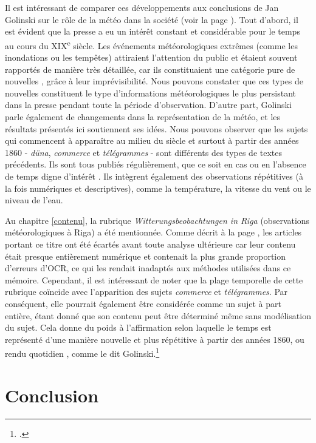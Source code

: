 \documentclass[a4paper,twoside,12pt]{article}
\begin{document}
Il est intéressant de comparer ces développements aux conclusions de Jan Golinski sur le rôle de la météo dans la société (voir la page \pageref{golinski}). Tout d'abord, il est évident que la presse a eu un intérêt constant et considérable pour le temps au cours du XIX\textsuperscript{e} siècle. Les événements météorologiques extrêmes (comme les inondations ou les tempêtes) attiraient l'attention du public et étaient souvent rapportés de manière très détaillée, car ils constituaient une catégorie pure de \og nouvelles \fg{}, grâce à leur imprévisibilité. Nous pouvons constater que ces types de nouvelles constituent le type d'informations météorologiques le plus persistant dans la presse pendant toute la période d'observation. D'autre part, Golinski parle également de changements dans la représentation de la météo, et les résultats présentés ici soutiennent ses idées. Nous pouvons observer que les sujets qui commencent à apparaître au milieu du siècle et surtout à partir des années 1860 - \textit{düna}, \textit{commerce} et \textit{télégrammes} - sont différents des types de textes précédents. Ils sont tous publiés régulièrement, que ce soit en cas ou en l'absence de temps \og digne d'intérêt \fg{}. Ils intègrent également des observations répétitives (à la fois numériques et descriptives), comme la température, la vitesse du vent ou le niveau de l'eau. 

Au chapitre \ref{contenu}, la rubrique \textit{Witterungsbeobachtungen in Riga} (observations météorologiques à Riga) a été mentionnée. Comme décrit à la page \pageref{beobachtungen_riga}, les articles portant ce titre ont été écartés avant toute analyse ultérieure car leur contenu était presque entièrement numérique et contenait la plus grande proportion d'erreurs d'OCR, ce qui les rendait inadaptés aux méthodes utilisées dans ce mémoire. Cependant, il est intéressant de noter que la plage temporelle de cette rubrique coïncide avec l'apparition des sujets \textit{commerce} et \textit{télégrammes}. Par conséquent, elle pourrait également être considérée comme un sujet à part entière, étant donné que son contenu peut être déterminé même sans modélisation du sujet. Cela donne du poids à l'affirmation selon laquelle le temps est représenté d'une manière nouvelle et plus répétitive à partir des années 1860, ou \og rendu quotidien \fg{}, comme le dit Golinski.\footcite[18]{golinski_time_2003}



\clearpage

\section*{Conclusion}
\end{document}
